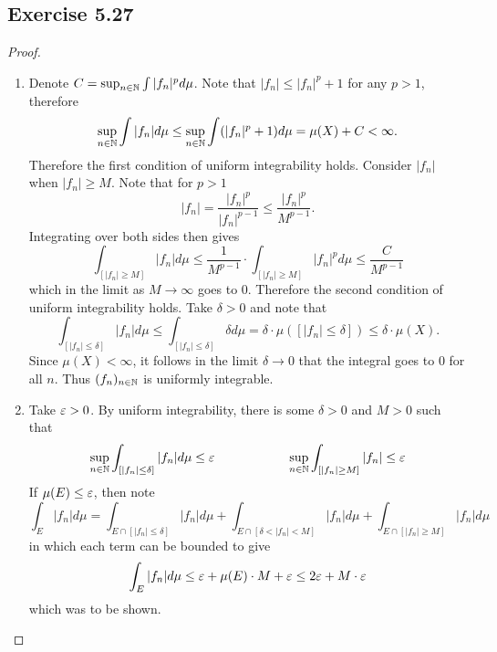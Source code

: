 \documentclass[hw_all.tex]{subfiles}
\begin{document}
\subsection{Exercise 5.27}

\begin{proof}
    \begin{enumerate}
        \item
            Denote $C = \sup_{n \in \mathbb{N}} \int |f_n|^p d \mu$. Note that $|f_n| \leq |f_n|^p + 1$ for any $p > 1$, therefore
            \[
                \sup_{n \in \mathbb{N}} \int |f_n| d \mu \leq \sup_{n \in \mathbb{N}} \int (|f_n|^p + 1) d \mu = \mu(X) + C < \infty
            .\]
            Therefore the first condition of uniform integrability holds. Consider $|f_n|$ when $|f_n| \geq M$. Note that for $p > 1$
            \[
                |f_n| = \frac{|f_n|^{p}}{|f_n|^{p - 1}} \leq \frac{|f_n|^p}{M^{p-1}}
            .\]
            Integrating over both sides then gives
            \[
                \int_{[|f_n| \geq M]} |f_n| d \mu \leq \frac{1}{M^{p-1}} \cdot \int_{[|f_n| \geq M]} |f_n|^p d \mu \leq \frac{C}{M^{p-1}}
            \]
            which in the limit as $M \to \infty$ goes to $0$. Therefore the second condition of uniform integrability holds. Take $\delta > 0$ and note that
            \[
                \int_{[|f_n| \leq \delta]} |f_n| d \mu \leq \int_{[|f_n| \leq \delta]} \delta d \mu = \delta \cdot \mu([|f_n| \leq \delta]) \leq \delta \cdot \mu(X)
            .\]
            Since $\mu(X) < \infty$, it follows in the limit $\delta \to 0$ that the integral goes to $0$ for all $n$. Thus $(f_n)_{n \in \mathbb{N}}$ is uniformly integrable.

        \item 
            Take $\varepsilon > 0$. By uniform integrability, there is some $\delta > 0$ and $M > 0$ such that
            \[
                \sup_{n \in \mathbb{N}} \int_{[|f_n| \leq \delta]} |f_n| d \mu \leq \varepsilon \hspace{2cm} \sup_{n \in \mathbb{N}} \int_{[|f_n| \geq M]} |f_n| \leq \varepsilon
            \]
            If $\mu(E) \leq \varepsilon$, then note
            \[
                \int_E |f_n| d \mu = \int_{E \cap [|f_n| \leq \delta]} |f_n| d \mu + \int_{E \cap [\delta < |f_n| < M]} |f_n| d \mu + \int_{E \cap [|f_n| \geq M]} |f_n| d \mu
            \]
            in which each term can be bounded to give
            \[
                \int_E |f_n| d \mu \leq \varepsilon + \mu(E) \cdot M + \varepsilon \leq 2 \varepsilon + M \cdot \varepsilon
            \]
            which was to be shown.


\end{enumerate}
\end{proof}
\end{document}
